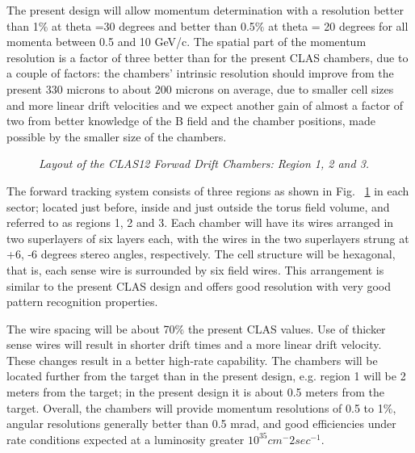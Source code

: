



  
The present design will allow momentum
determination with a resolution better than 1$\%$ at theta =30 degrees
and better than 0.5$\%$ at theta = 20 degrees for all momenta between 0.5
and 10 GeV/c.  The spatial part of the momentum resolution is 
a factor of three better than for the present CLAS chambers, due 
to a couple of factors: the chambers' intrinsic resolution should
improve from the present 330 microns to about 200 microns on average,
due to smaller cell sizes and more linear drift velocities and we
expect another gain of almost a factor of two from better knowledge
of the B field and the chamber positions, made possible by the smaller
size of the chambers.
\begin{figure}[tb]
\begin{center}
\caption{\it{\small Layout of the CLAS12 Forwad Drift Chambers: Region 1, 2 and 3.}}
\label{fig:CLAS12 FDC}
\end{center}
\end{figure}
The forward tracking system consists of three regions as shown in 
Fig. ~\ref{fig:CLAS12 FDC} in each sector;
located just before, inside and just outside the torus field volume, and
referred to as regions 1, 2 and 3.  Each chamber will have its wires 
arranged in two superlayers of six layers each, with the wires in the two 
superlayers strung at +6, -6 degrees stereo angles, respectively.  The cell 
structure will be hexagonal, that is, each sense wire is surrounded by six
field wires.  This arrangement is similar to the present CLAS design
and offers good resolution with very good pattern recognition properties.

The wire spacing will be about 70$\%$ the present CLAS values.  
Use of thicker sense wires will result in  shorter drift times and
a more linear drift velocity.  These changes result in a better high-rate
capability.  
The chambers will be located further from the target than in the present
design, e.g. region 1 will be 2 meters from the target; in the present
design it is about 0.5 meters from the target. Overall, 
the chambers will provide momentum resolutions of 0.5 to 1$\%$,
angular resolutions generally better than 0.5 mrad, and good efficiencies
under rate conditions expected at a luminosity greater $10^{35}cm^-{2}sec^{-1}$. 



